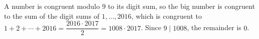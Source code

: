 A number is congruent modulo $9$ to its digit sum, so the big number is congruent to the sum of the digit sums of $1,\dots,2016$, which is congruent to $1+2+\cdots+2016=\dfrac{2016\cdot2017}{2}=1008\cdot2017$. Since $9\mid1008$, the remainder is $\boxed{0}$.
